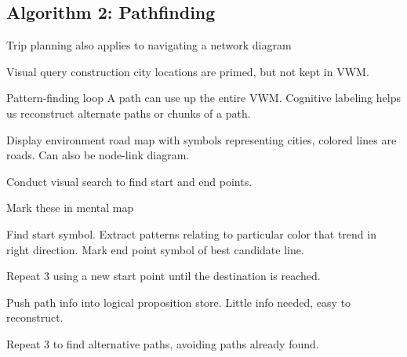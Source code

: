 \begin{mdframed}
\begin{multicols}{2}
\subsection{Algorithm 2: Pathfinding}
\begin{compactdesc}
\item[Trip planning] also applies to navigating a network diagram
\item[Visual query construction] city locations are primed, but not kept in
    VWM.
\item[Pattern-finding loop] A path can use up the entire VWM.
    Cognitive labeling helps us reconstruct alternate paths or chunks of a
    path.
\item[Display environment] road map with symbols representing cities, colored
    lines are roads. Can also be node-link diagram.
\end{compactdesc}
\midrule\begin{compactenum}
\item Conduct visual search to find start and end points.
\item Mark these in mental map
\item Find start symbol. Extract patterns relating to particular color that
    trend in right direction. Mark end point symbol of best candidate
    line.
\item Repeat 3 using a new start point until the destination is reached.
\item Push path info into logical proposition store. Little info needed, easy
    to reconstruct.
\item Repeat 3 to find alternative paths, avoiding paths already found.
\end{compactenum}
\end{multicols}\end{mdframed}





